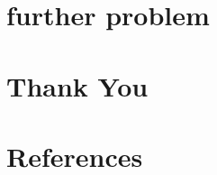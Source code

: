 \documentclass{beamer}
\begin{document}
\section{further problem}


\section{Thank You}

\begin{frame}
\end{frame}

\section{References}

\begin{frame}[allowframebreaks]
  \printbibliography[heading=bibintoc]
\end{frame}
\end{document}
